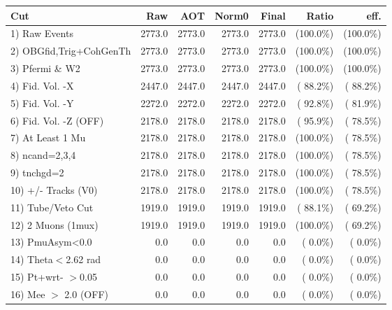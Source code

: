  \begin{table}[h!]\centering
 \begin{tabular}{||l||r|r|r|r|r|r||}
 \hline
 \hline
 Cut & Raw & AOT & Norm0 & Final & Ratio & eff.       \\
 \hline
  1) Raw Events           &       2773.0 &       2773.0 &       2773.0 &       2773.0 & (100.0\%) & (100.0\%) \\
  2) OBGfid,Trig+CohGenTh &       2773.0 &       2773.0 &       2773.0 &       2773.0 & (100.0\%) & (100.0\%) \\
  3) Pfermi \& W2         &       2773.0 &       2773.0 &       2773.0 &       2773.0 & (100.0\%) & (100.0\%) \\
  4) Fid. Vol. -X         &       2447.0 &       2447.0 &       2447.0 &       2447.0 & ( 88.2\%) & ( 88.2\%) \\
  5) Fid. Vol. -Y         &       2272.0 &       2272.0 &       2272.0 &       2272.0 & ( 92.8\%) & ( 81.9\%) \\
  6) Fid. Vol. -Z (OFF)   &       2178.0 &       2178.0 &       2178.0 &       2178.0 & ( 95.9\%) & ( 78.5\%) \\
  7) At Least 1 Mu        &       2178.0 &       2178.0 &       2178.0 &       2178.0 & (100.0\%) & ( 78.5\%) \\
  8) ncand=2,3,4          &       2178.0 &       2178.0 &       2178.0 &       2178.0 & (100.0\%) & ( 78.5\%) \\
  9) tnchgd=2             &       2178.0 &       2178.0 &       2178.0 &       2178.0 & (100.0\%) & ( 78.5\%) \\
 10) +/- Tracks (V0)      &       2178.0 &       2178.0 &       2178.0 &       2178.0 & (100.0\%) & ( 78.5\%) \\
 11) Tube/Veto Cut        &       1919.0 &       1919.0 &       1919.0 &       1919.0 & ( 88.1\%) & ( 69.2\%) \\
 12) 2 Muons (1mux)       &       1919.0 &       1919.0 &       1919.0 &       1919.0 & (100.0\%) & ( 69.2\%) \\
 13) PmuAsym<0.0          &          0.0 &          0.0 &          0.0 &          0.0 & (  0.0\%) & (  0.0\%) \\
 14) Theta$<$2.62 rad     &          0.0 &          0.0 &          0.0 &          0.0 & (  0.0\%) & (  0.0\%) \\
 15) Pt+wrt- $>$0.05      &          0.0 &          0.0 &          0.0 &          0.0 & (  0.0\%) & (  0.0\%) \\
 16) Mee $>$ 2.0  (OFF)   &          0.0 &          0.0 &          0.0 &          0.0 & (  0.0\%) & (  0.0\%) \\

\end{tabular}
\end{table}

